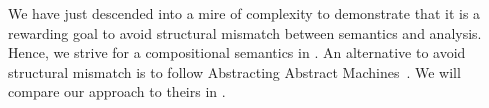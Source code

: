 We have just descended into a mire of complexity to demonstrate that it is
a rewarding goal to avoid structural mismatch between semantics and
analysis.
Hence, we strive for a compositional semantics in
.
An alternative to avoid structural mismatch is to follow Abstracting Abstract
Machines~\citep{aam}.
We will compare our approach to theirs in .

%
